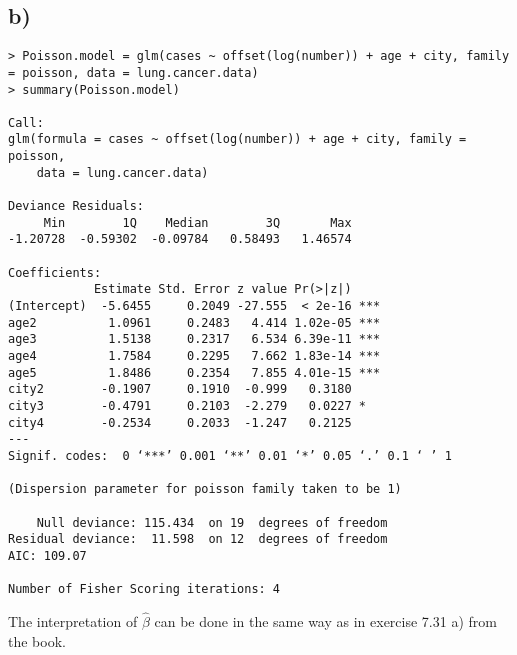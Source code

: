 \documentclass[a4paper]{article}
\begin{document}
\vspace{\baselineskip}
\subsection{b)}

\begin{lstlisting}
> Poisson.model = glm(cases ~ offset(log(number)) + age + city, family = poisson, data = lung.cancer.data)
> summary(Poisson.model)

Call:
glm(formula = cases ~ offset(log(number)) + age + city, family = poisson, 
    data = lung.cancer.data)

Deviance Residuals: 
     Min        1Q    Median        3Q       Max  
-1.20728  -0.59302  -0.09784   0.58493   1.46574  

Coefficients:
            Estimate Std. Error z value Pr(>|z|)    
(Intercept)  -5.6455     0.2049 -27.555  < 2e-16 ***
age2          1.0961     0.2483   4.414 1.02e-05 ***
age3          1.5138     0.2317   6.534 6.39e-11 ***
age4          1.7584     0.2295   7.662 1.83e-14 ***
age5          1.8486     0.2354   7.855 4.01e-15 ***
city2        -0.1907     0.1910  -0.999   0.3180    
city3        -0.4791     0.2103  -2.279   0.0227 *  
city4        -0.2534     0.2033  -1.247   0.2125    
---
Signif. codes:  0 ‘***’ 0.001 ‘**’ 0.01 ‘*’ 0.05 ‘.’ 0.1 ‘ ’ 1

(Dispersion parameter for poisson family taken to be 1)

    Null deviance: 115.434  on 19  degrees of freedom
Residual deviance:  11.598  on 12  degrees of freedom
AIC: 109.07

Number of Fisher Scoring iterations: 4
\end{lstlisting}
The interpretation of $\widehat{\beta}$ can be done in the same way as in exercise 7.31 a) from the book.

\vspace{\baselineskip}
\end{document}
